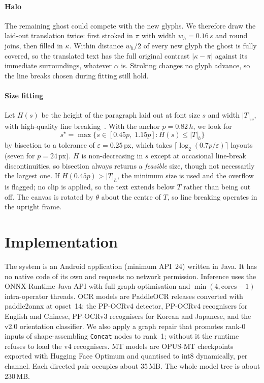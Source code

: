 \documentclass[journal]{IEEEtran}
\theoremstyle{definition}
\begin{document}
\paragraph{Halo}
The remaining ghost could compete with the new glyphs. We therefore draw the
laid-out translation twice: first stroked in $\pi$ with width
$w_h=0.16\,s$ and round joins, then filled in $\kappa$. Within distance
$w_h/2$ of every new glyph the ghost is fully covered, so the translated text
has the full original contrast $|\kappa-\pi|$ against its immediate
surroundings, whatever $\alpha$ is. Stroking changes no glyph advance, so the
line breaks chosen during fitting still hold.

\paragraph{Size fitting}
Let $H(s)$ be the height of the paragraph laid out at font size $s$ and width
$|T|_w$, with high-quality line breaking~\cite{knuth1981breaking}. With the
anchor $p=0.82\,h$, we look for
\begin{equation}
  s^\star=\max\{s\in[0.45p,\;1.15p]:H(s)\le |T|_h\}
\end{equation}
by bisection to a tolerance of $\varepsilon=0.25$\,px, which takes
$\lceil\log_2(0.7p/\varepsilon)\rceil$ layouts (seven for $p=24$\,px). $H$ is
non-decreasing in $s$ except at occasional line-break discontinuities, so
bisection always returns a \emph{feasible} size, though not necessarily the
largest one. If $H(0.45p)>|T|_h$, the minimum size is used and the overflow is
flagged; no clip is applied, so the text extends below $T$ rather than being
cut off. The canvas is rotated by $\theta$ about the centre of $T$,
so line breaking operates in the upright frame.

\section{Implementation}\label{sec:impl}
The system is an Android application (minimum API~24) written in Java. It has
no native code of its own and requests no network permission. Inference uses
the ONNX Runtime Java API with full graph optimisation and
$\min(4,\text{cores}-1)$ intra-operator threads. OCR models are PaddleOCR
releases converted with paddle2onnx at opset~14: the PP-OCRv4 detector,
PP-OCRv4 recognisers for English and Chinese, PP-OCRv3 recognisers for Korean
and Japanese, and the v2.0 orientation classifier. We also apply a graph
repair that promotes rank-0 inputs of shape-assembling \texttt{Concat} nodes
to rank~1; without it the runtime refuses to load the v4 recognisers. MT
models are OPUS-MT checkpoints exported with Hugging Face Optimum and quantised
to int8 dynamically, per channel. Each directed pair occupies about 35\,MB. The
whole model tree is about 230\,MB.
\end{document}
